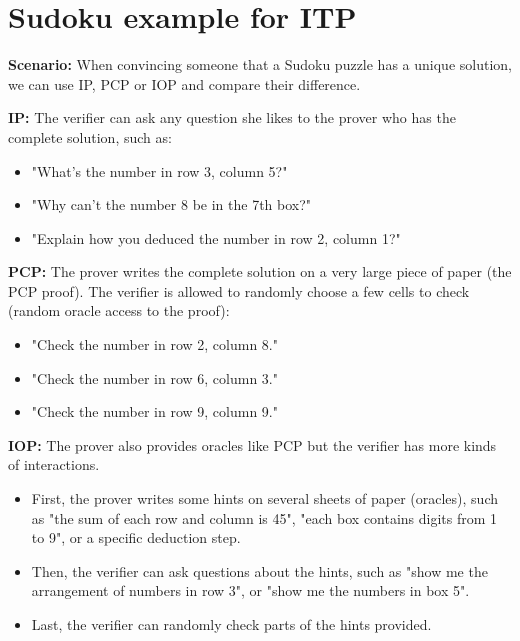\documentclass[letterpaper,twocolumn,10pt]{article}
\theoremstyle{definition}
\newcommand{\mypara}[1]{\noindent\textbf{{#1: }}}
\newcommand{\new}[1]{{#1}\xspace}
\begin{document}
\section{Sudoku example for ITP}
\label{app: ITP}
\new{
	\mypara{Scenario} When convincing someone that a Sudoku puzzle has a unique solution, we can use IP, PCP or IOP and compare their difference.
	
	\mypara{IP} The verifier can ask any question she likes to the prover who has the complete solution, such as:
	\begin{itemize}[noitemsep, topsep=2pt, partopsep=0pt,leftmargin=0.4cm]
		\item "What's the number in row 3, column 5?"
		\item "Why can't the number 8 be in the 7th box?"
		\item "Explain how you deduced the number in row 2, column 1?"
	\end{itemize}
	
	\mypara{PCP} The prover writes the complete solution on a very large piece of paper (the PCP proof). The verifier is allowed to randomly choose a few cells to check (random oracle access to the proof):
	\begin{itemize}[noitemsep, topsep=2pt, partopsep=0pt,leftmargin=0.4cm]
		\item "Check the number in row 2, column 8."
		\item "Check the number in row 6, column 3."
		\item "Check the number in row 9, column 9."
	\end{itemize}
	
	\mypara{IOP} The prover also provides oracles like PCP but the verifier has more kinds of interactions. 
	\begin{itemize}[noitemsep, topsep=2pt, partopsep=0pt,leftmargin=0.4cm]
		\item First, the prover writes some hints on several sheets of paper (oracles), such as "the sum of each row and column is 45", "each box contains digits from 1 to 9", or a specific deduction step.
		\item Then, the verifier can ask questions about the hints, such as "show me the arrangement of numbers in row 3", or "show me the numbers in box 5".
		\item Last, the verifier can randomly check parts of the hints provided.
	\end{itemize}
}
\end{document}

